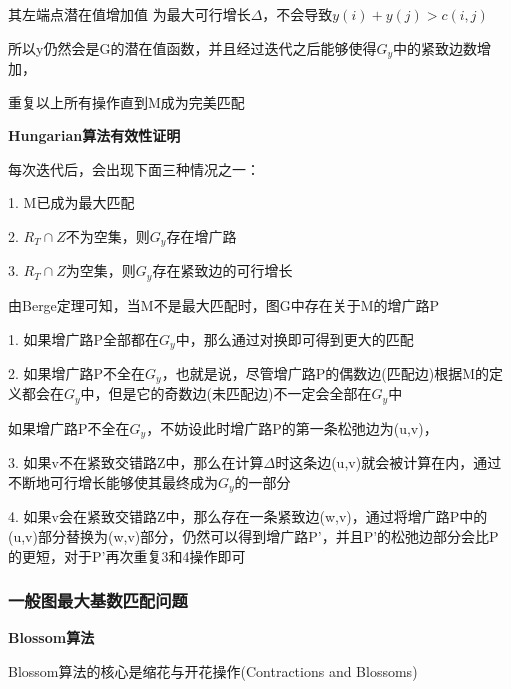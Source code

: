 \documentclass[UTF8]{ctexart}
\begin{document}
其左端点潜在值增加值 为最大可行增长$\Delta$，不会导致$y(i)+y(j)> c(i,j)$

\vspace{0.5cm}

所以y仍然会是G的潜在值函数，并且经过迭代之后能够使得$G_y$中的紧致边数增加，

重复以上所有操作直到M成为完美匹配

\vspace{1.5cm}

\textbf{Hungarian算法有效性证明}

每次迭代后，会出现下面三种情况之一：

\vspace{0.15cm}

1. M已成为最大匹配

2. $R_T\cap Z$不为空集，则$G_y$存在增广路

3. $R_T\cap Z$为空集，则$G_y$存在紧致边的可行增长

\vspace{0.5cm}

由Berge定理可知，当M不是最大匹配时，图G中存在关于M的增广路P

1. 如果增广路P全部都在$G_y$中，那么通过对换即可得到更大的匹配

2. 如果增广路P不全在$G_y$，也就是说，尽管增广路P的偶数边(匹配边)根据M的定义都会在$G_y$中，但是它的奇数边(未匹配边)不一定会全部在$G_y$中

\vspace{0.5cm}

如果增广路P不全在$G_y$，不妨设此时增广路P的第一条松弛边为(u,v)，

3. 如果v不在紧致交错路Z中，那么在计算$\Delta$时这条边(u,v)就会被计算在内，通过不断地可行增长能够使其最终成为$G_y$的一部分

4. 如果v会在紧致交错路Z中，那么存在一条紧致边(w,v)，通过将增广路P中的(u,v)部分替换为(w,v)部分，仍然可以得到增广路P'，并且P'的松弛边部分会比P的更短，对于P'再次重复3和4操作即可

\vspace{0.5cm}



\subsubsection{一般图最大基数匹配问题}

\textbf{Blossom算法}\cite{edmonds1965paths}

Blossom算法的核心是缩花与开花操作(Contractions and Blossoms)
\end{document}
